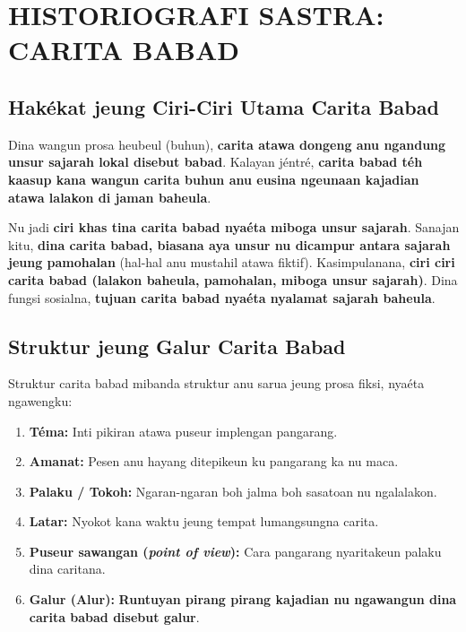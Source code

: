 \documentclass[12pt, a4paper]{article}
\begin{document}
\newpage

\section{HISTORIOGRAFI SASTRA: CARITA BABAD}

\subsection{Hakékat jeung Ciri-Ciri Utama Carita Babad}
Dina wangun prosa heubeul (buhun), \textbf{carita atawa dongeng anu ngandung unsur sajarah lokal disebut babad}. Kalayan jéntré, \textbf{carita babad téh kaasup kana wangun carita buhun anu eusina ngeunaan kajadian atawa lalakon di jaman baheula}. 

Nu jadi \textbf{ciri khas tina carita babad nyaéta miboga unsur sajarah}. Sanajan kitu, \textbf{dina carita babad, biasana aya unsur nu dicampur antara sajarah jeung pamohalan} (hal-hal anu mustahil atawa fiktif).
Kasimpulanana, \textbf{ciri ciri carita babad (lalakon baheula, pamohalan, miboga unsur sajarah)}. Dina fungsi sosialna, \textbf{tujuan carita babad nyaéta nyalamat sajarah baheula}.

\subsection{Struktur jeung Galur Carita Babad}
Struktur carita babad mibanda struktur anu sarua jeung prosa fiksi, nyaéta ngawengku:
\begin{enumerate}
    \item \textbf{Téma:} Inti pikiran atawa puseur implengan pangarang.
    \item \textbf{Amanat:} Pesen anu hayang ditepikeun ku pangarang ka nu maca.
    \item \textbf{Palaku / Tokoh:} Ngaran-ngaran boh jalma boh sasatoan nu ngalalakon.
    \item \textbf{Latar:} Nyokot kana waktu jeung tempat lumangsungna carita.
    \item \textbf{Puseur sawangan (\textit{point of view}):} Cara pangarang nyaritakeun palaku dina caritana.
    \item \textbf{Galur (Alur):} \textbf{Runtuyan pirang pirang kajadian nu ngawangun dina carita babad disebut galur}.
\end{enumerate}
\end{document}
